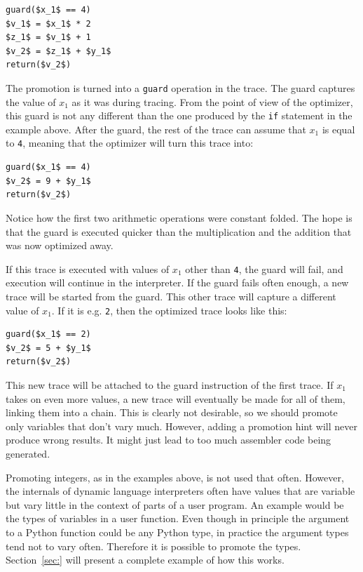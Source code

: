 \documentclass{sigplanconf}
\newcommand\cfbolz[1]{\nb{CFB}{#1}}
\begin{document}
\begin{lstlisting}[mathescape,basicstyle=\ttfamily]
guard($x_1$ == 4)
$v_1$ = $x_1$ * 2
$z_1$ = $v_1$ + 1
$v_2$ = $z_1$ + $y_1$
return($v_2$)
\end{lstlisting}

The promotion is turned into a \texttt{guard} operation in the trace. The guard
captures the value of $x_1$ as it was during tracing. \cfbolz{drop the word runtime feedback here?}
From the point of view of the
optimizer, this guard is not any different than the one produced by the \texttt{if}
statement in the example above. After the guard, the rest of the trace can
assume that $x_1$ is equal to \texttt{4}, meaning that the optimizer will turn this
trace into:

\begin{lstlisting}[mathescape,basicstyle=\ttfamily]
guard($x_1$ == 4)
$v_2$ = 9 + $y_1$
return($v_2$)
\end{lstlisting}

Notice how the first two arithmetic operations were constant folded. The hope is
that the guard is executed quicker than the multiplication and the addition that
was now optimized away.

If this trace is executed with values of $x_1$ other than \texttt{4}, the guard will
fail, and execution will continue in the interpreter. If the guard fails often
enough, a new trace will be started from the guard. This other trace will
capture a different value of $x_1$. If it is e.g. \texttt{2}, then the optimized
trace looks like this:

\begin{lstlisting}[mathescape,basicstyle=\ttfamily]
guard($x_1$ == 2)
$v_2$ = 5 + $y_1$
return($v_2$)
\end{lstlisting}

This new trace will be attached to the guard instruction of the first trace. If
$x_1$ takes on even more values, a new trace will eventually be made for all of them,
linking them into a chain. This is clearly not desirable, so we should promote
only variables that don't vary much. However, adding a promotion hint will never produce wrong
results. It might just lead to too much assembler code being generated.

Promoting integers, as in the examples above, is not used that often.
However, the internals of dynamic language interpreters often
have values that are variable but vary little in the context of parts of a user
program. An example would be the types of variables in a user function. Even
though in principle the argument to a Python function could be any Python type,
in practice the argument types tend not to vary often. Therefore it is possible to
promote the types. Section~\ref{sec:} will present a complete example of how
this works.
\end{document}
